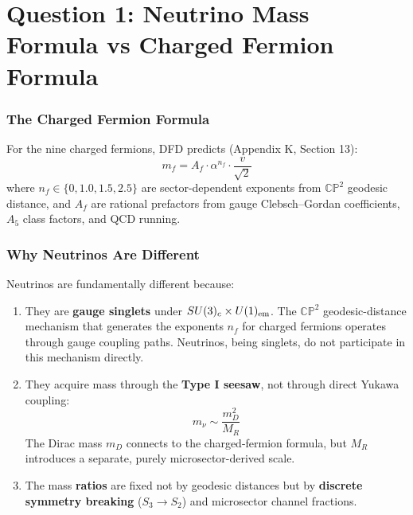\documentclass[11pt,a4paper]{article}
\begin{document}
\part{Question 1: Neutrino Mass Formula vs Charged Fermion Formula}

\section{The Charged Fermion Formula}

For the nine charged fermions, DFD predicts (Appendix K, Section 13):
\begin{equation}
\boxed{m_f = A_f \cdot \alpha^{n_f} \cdot \frac{v}{\sqrt{2}}}
\end{equation}
where $n_f \in \{0, 1.0, 1.5, 2.5\}$ are sector-dependent exponents from
$\mathbb{CP}^2$ geodesic distance, and $A_f$ are rational prefactors from
gauge Clebsch--Gordan coefficients, $A_5$ class factors, and QCD running.

\section{Why Neutrinos Are Different}

Neutrinos are fundamentally different because:
\begin{enumerate}
\item They are \textbf{gauge singlets} under $SU(3)_c \times U(1)_{\rm em}$.
  The $\mathbb{CP}^2$ geodesic-distance mechanism that generates the
  exponents $n_f$ for charged fermions operates through gauge coupling
  paths. Neutrinos, being singlets, do not participate in this mechanism
  directly.

\item They acquire mass through the \textbf{Type I seesaw}, not through
  direct Yukawa coupling:
  \begin{equation}
  m_\nu \sim \frac{m_D^2}{M_R}
  \end{equation}
  The Dirac mass $m_D$ connects to the charged-fermion formula, but $M_R$
  introduces a separate, purely microsector-derived scale.

\item The mass \textbf{ratios} are fixed not by geodesic distances but by
  \textbf{discrete symmetry breaking} ($S_3 \to S_2$) and microsector
  channel fractions.
\end{enumerate}
\end{document}
